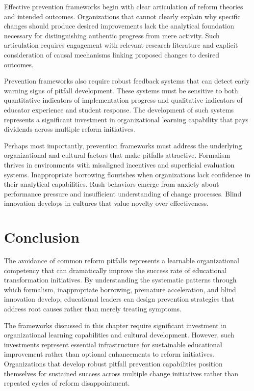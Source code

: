 \documentclass[
  Letterpaper,
]{scrbook}
\begin{document}
Effective prevention frameworks begin with clear articulation of reform
theories and intended outcomes. Organizations that cannot clearly
explain why specific changes should produce desired improvements lack
the analytical foundation necessary for distinguishing authentic
progress from mere activity. Such articulation requires engagement with
relevant research literature and explicit consideration of causal
mechanisms linking proposed changes to desired outcomes.

Prevention frameworks also require robust feedback systems that can
detect early warning signs of pitfall development. These systems must be
sensitive to both quantitative indicators of implementation progress and
qualitative indicators of educator experience and student response. The
development of such systems represents a significant investment in
organizational learning capability that pays dividends across multiple
reform initiatives.

Perhaps most importantly, prevention frameworks must address the
underlying organizational and cultural factors that make pitfalls
attractive. Formalism thrives in environments with misaligned incentives
and superficial evaluation systems. Inappropriate borrowing flourishes
when organizations lack confidence in their analytical capabilities.
Rush behaviors emerge from anxiety about performance pressure and
insufficient understanding of change processes. Blind innovation
develops in cultures that value novelty over effectiveness.

\section{Conclusion}\label{conclusion-5}

The avoidance of common reform pitfalls represents a learnable
organizational competency that can dramatically improve the success rate
of educational transformation initiatives. By understanding the
systematic patterns through which formalism, inappropriate borrowing,
premature acceleration, and blind innovation develop, educational
leaders can design prevention strategies that address root causes rather
than merely treating symptoms.

The frameworks discussed in this chapter require significant investment
in organizational learning capabilities and cultural development.
However, such investments represent essential infrastructure for
sustainable educational improvement rather than optional enhancements to
reform initiatives. Organizations that develop robust pitfall prevention
capabilities position themselves for sustained success across multiple
change initiatives rather than repeated cycles of reform disappointment.
\end{document}

